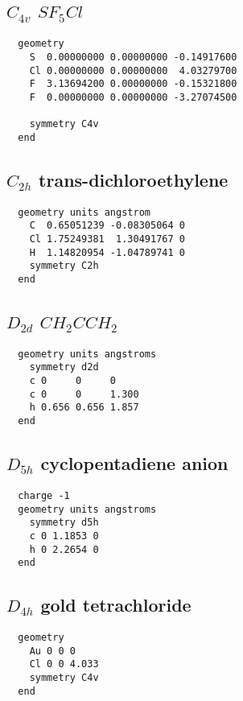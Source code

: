   \subsection{\protect$C_{4v}$ \protect$SF_5Cl$}

\begin{verbatim}
  geometry
    S  0.00000000 0.00000000 -0.14917600 
    Cl 0.00000000 0.00000000  4.03279700 
    F  3.13694200 0.00000000 -0.15321800 
    F  0.00000000 0.00000000 -3.27074500 

    symmetry C4v
  end
\end{verbatim}

  \subsection{\protect$C_{2h}$ trans-dichloroethylene}
\begin{verbatim}
  geometry units angstrom
    C  0.65051239 -0.08305064 0 
    Cl 1.75249381  1.30491767 0 
    H  1.14820954 -1.04789741 0 
    symmetry C2h
  end
\end{verbatim}

  \subsection{\protect$D_{2d}$ \protect$CH_2CCH_2$}
\begin{verbatim}
  geometry units angstroms
    symmetry d2d
    c 0     0     0 
    c 0     0     1.300 
    h 0.656 0.656 1.857 
  end
\end{verbatim}

  \subsection{\protect$D_{5h}$ cyclopentadiene anion}
\begin{verbatim}
  charge -1
  geometry units angstroms
    symmetry d5h
    c 0 1.1853 0 
    h 0 2.2654 0 
  end
\end{verbatim}


  \subsection{\protect$D_{4h}$ gold tetrachloride}

\begin{verbatim}
  geometry
    Au 0 0 0 
    Cl 0 0 4.033
    symmetry C4v
  end
\end{verbatim}
